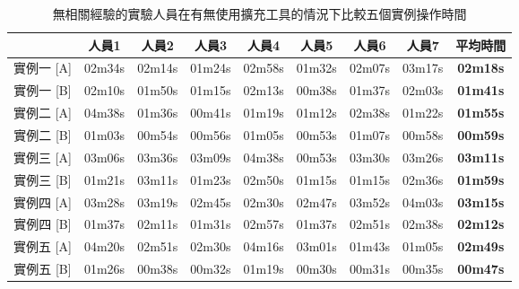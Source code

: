 \begin{table}[H]
    \begin{center}
    \setlength{\abovecaptionskip}{10pt}
    \setlength{\belowcaptionskip}{-10pt}
    \caption{無相關經驗的實驗人員在有無使用擴充工具的情況下比較五個實例操作時間}\label{t4.1}
        \begin{tabular}{|c|c|c|c|c|c|c|c|c|}   \hline
        & 人員1   & 人員2   & 人員3   & 人員4   & 人員5   & 人員6   & 人員7    & \textbf{平均時間}\\\hline\hline
        實例一 [A]   & 02m34s    & 02m14s    & 01m24s    & 02m58s    & 01m32s    & 02m07s    & 03m17s    & \textbf{02m18s}\\\hline
        實例一 [B]   & 02m10s    & 01m50s    & 01m15s    & 02m13s    & 00m38s    & 01m37s    & 02m03s    & \textbf{01m41s}\\\hline\hline
        實例二 [A]   & 04m38s    & 01m36s    & 00m41s    & 01m19s    & 01m12s    & 02m38s    & 01m22s    & \textbf{01m55s}\\\hline
        實例二 [B]   & 01m03s    & 00m54s    & 00m56s    & 01m05s    & 00m53s    & 01m07s    & 00m58s    & \textbf{00m59s}\\\hline\hline
        實例三 [A]   & 03m06s    & 03m36s    & 03m09s    & 04m38s    & 00m53s    & 03m30s    & 03m26s    & \textbf{03m11s}\\\hline
        實例三 [B]   & 01m21s    & 03m11s    & 01m23s    & 02m50s    & 01m15s    & 01m15s    & 02m36s    & \textbf{01m59s}\\\hline\hline
        實例四 [A]   & 03m28s    & 03m19s    & 02m45s    & 02m30s    & 02m47s    & 03m52s    & 04m03s    & \textbf{03m15s}\\\hline
        實例四 [B]   & 01m37s    & 02m11s    & 01m31s    & 02m57s    & 01m37s    & 02m51s    & 02m38s    & \textbf{02m12s}\\\hline\hline
        實例五 [A]   & 04m20s    & 02m51s    & 02m30s    & 04m16s    & 03m01s    & 01m43s    & 01m05s    & \textbf{02m49s}\\\hline
        實例五 [B]   & 01m26s    & 00m38s    & 00m32s    & 01m19s    & 00m30s    & 00m31s    & 00m35s    & \textbf{00m47s}\\\hline\hline
        \end{tabular}
    \end{center}
\end{table}

